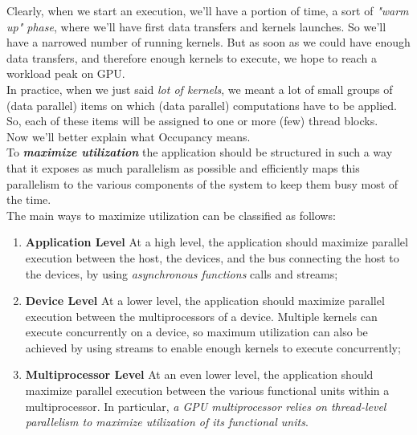 	Clearly, when we start an execution, we'll have a portion of time, a sort of \textit{"warm up" phase}, where we'll have first data transfers and kernels launches. So we'll have a narrowed number of running kernels. 
	But as soon as we could have enough data transfers, and therefore enough kernels to execute, we hope to reach a workload peak on GPU.\\
	In practice, when we just said \textit{lot of kernels}, we meant a lot of small groups of (data parallel) items on which (data parallel) computations have to be applied. So, each of these items will be assigned to one or more (few) thread blocks.\\ Now we'll better explain what Occupancy means.\\

	To \textit{\textbf{maximize utilization}} the application should be structured in such a way that it exposes as much parallelism as possible and efficiently maps this parallelism to the various components of the system to keep them busy most of the time\cite{cudaguide}.\\
	The main ways to maximize utilization can be classified as follows:
	\begin{enumerate}
			\item \textbf{Application Level}
			At a high level, the application should maximize parallel execution between the host, the	devices, and the bus connecting the host to the devices, by using \textit{asynchronous functions} calls and streams;
			
			
			\item \textbf{Device Level}
			At a lower level, the application should maximize parallel execution between the multiprocessors of a device.
			Multiple kernels can execute concurrently on a device, so maximum utilization can also be achieved by using streams to enable enough kernels to execute concurrently;
			
			
			\item \textbf{Multiprocessor Level}
			At an even lower level, the application should maximize parallel execution between the	various functional units within a multiprocessor.
			In particular, \textit{a GPU multiprocessor relies on thread-level parallelism to maximize utilization of its functional units}\cite{cudaguide}. 
	\end{enumerate}
	
